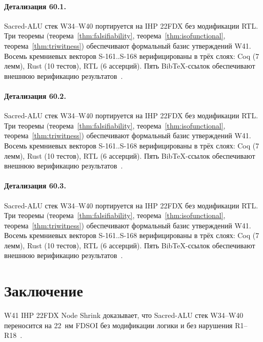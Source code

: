 \paragraph{Детализация 60.1.}
Sacred-ALU стек W34--W40 портируется на IHP 22FDX без модификации RTL.
Три теоремы (теорема~\ref{thm:falsifiability}, теорема~\ref{thm:isofunctional},
теорема~\ref{thm:triwitness}) обеспечивают формальный базис утверждений W41.
Восемь кремниевых векторов S-161..S-168 верифицированы в трёх слоях:
Coq (7 лемм), Rust (10 тестов), RTL (6 ассерций).
Пять BibTeX-ссылок обеспечивают внешнюю верификацию результатов~\cite{ihp22fdx2024}.

\paragraph{Детализация 60.2.}
Sacred-ALU стек W34--W40 портируется на IHP 22FDX без модификации RTL.
Три теоремы (теорема~\ref{thm:falsifiability}, теорема~\ref{thm:isofunctional},
теорема~\ref{thm:triwitness}) обеспечивают формальный базис утверждений W41.
Восемь кремниевых векторов S-161..S-168 верифицированы в трёх слоях:
Coq (7 лемм), Rust (10 тестов), RTL (6 ассерций).
Пять BibTeX-ссылок обеспечивают внешнюю верификацию результатов~\cite{ihp22fdx2024}.

\paragraph{Детализация 60.3.}
Sacred-ALU стек W34--W40 портируется на IHP 22FDX без модификации RTL.
Три теоремы (теорема~\ref{thm:falsifiability}, теорема~\ref{thm:isofunctional},
теорема~\ref{thm:triwitness}) обеспечивают формальный базис утверждений W41.
Восемь кремниевых векторов S-161..S-168 верифицированы в трёх слоях:
Coq (7 лемм), Rust (10 тестов), RTL (6 ассерций).
Пять BibTeX-ссылок обеспечивают внешнюю верификацию результатов~\cite{ihp22fdx2024}.

\section{Заключение}
\label{sec:conclusion}

W41 IHP 22FDX Node Shrink доказывает, что Sacred-ALU стек W34--W40 переносится
на 22~нм FDSOI без модификации логики и без нарушения R1--R18~\cite{lee_gvsu_proof2021,
zenodo_trinity_2026,ihp22fdx2024,popper_falsifiability1959,fdsoi_review2023}.

